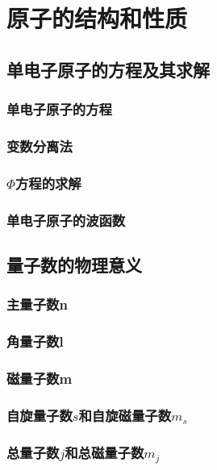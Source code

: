 \chapter{原子的结构和性质}

\section{单电子原子的\schr 方程及其求解}

\subsection{单电子原子的\schr 方程}

\subsection{变数分离法}

\subsection{$\Phi$方程的求解}

\subsection{单电子原子的波函数}




\section{量子数的物理意义}

\subsection{主量子数n}

\subsection{角量子数l}

\subsection{磁量子数m}

\subsection{自旋量子数$s$和自旋磁量子数$m_s$}

\subsection{总量子数$j$和总磁量子数$m_j$}





